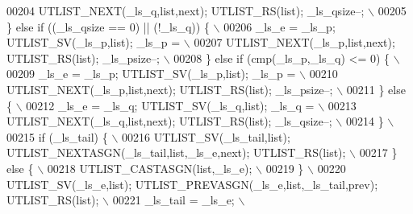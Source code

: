 \begin{DoxyCode}
00204 \textcolor{preprocessor}{              UTLIST\_NEXT(\_ls\_q,list,next); UTLIST\_RS(list); \_ls\_qsize--;                      \(\backslash\)}
00205 \textcolor{preprocessor}{          \} else if ((\_ls\_qsize == 0) || (!\_ls\_q)) \{                                           \(\backslash\)}
00206 \textcolor{preprocessor}{            \_ls\_e = \_ls\_p; UTLIST\_SV(\_ls\_p,list); \_ls\_p =                                      \(\backslash\)}
00207 \textcolor{preprocessor}{              UTLIST\_NEXT(\_ls\_p,list,next); UTLIST\_RS(list); \_ls\_psize--;                      \(\backslash\)}
00208 \textcolor{preprocessor}{          \} else if (cmp(\_ls\_p,\_ls\_q) <= 0) \{                                                  \(\backslash\)}
00209 \textcolor{preprocessor}{            \_ls\_e = \_ls\_p; UTLIST\_SV(\_ls\_p,list); \_ls\_p =                                      \(\backslash\)}
00210 \textcolor{preprocessor}{              UTLIST\_NEXT(\_ls\_p,list,next); UTLIST\_RS(list); \_ls\_psize--;                      \(\backslash\)}
00211 \textcolor{preprocessor}{          \} else \{                                                                             \(\backslash\)}
00212 \textcolor{preprocessor}{            \_ls\_e = \_ls\_q; UTLIST\_SV(\_ls\_q,list); \_ls\_q =                                      \(\backslash\)}
00213 \textcolor{preprocessor}{              UTLIST\_NEXT(\_ls\_q,list,next); UTLIST\_RS(list); \_ls\_qsize--;                      \(\backslash\)}
00214 \textcolor{preprocessor}{          \}                                                                                    \(\backslash\)}
00215 \textcolor{preprocessor}{          if (\_ls\_tail) \{                                                                      \(\backslash\)}
00216 \textcolor{preprocessor}{            UTLIST\_SV(\_ls\_tail,list); UTLIST\_NEXTASGN(\_ls\_tail,list,\_ls\_e,next); UTLIST\_RS(list); \(\backslash\)}
00217 \textcolor{preprocessor}{          \} else \{                                                                             \(\backslash\)}
00218 \textcolor{preprocessor}{            UTLIST\_CASTASGN(list,\_ls\_e);                                                       \(\backslash\)}
00219 \textcolor{preprocessor}{          \}                                                                                    \(\backslash\)}
00220 \textcolor{preprocessor}{          UTLIST\_SV(\_ls\_e,list); UTLIST\_PREVASGN(\_ls\_e,list,\_ls\_tail,prev); UTLIST\_RS(list);   \(\backslash\)}
00221 \textcolor{preprocessor}{          \_ls\_tail = \_ls\_e;                                                                    \(\backslash\)}

\end{DoxyCode}
